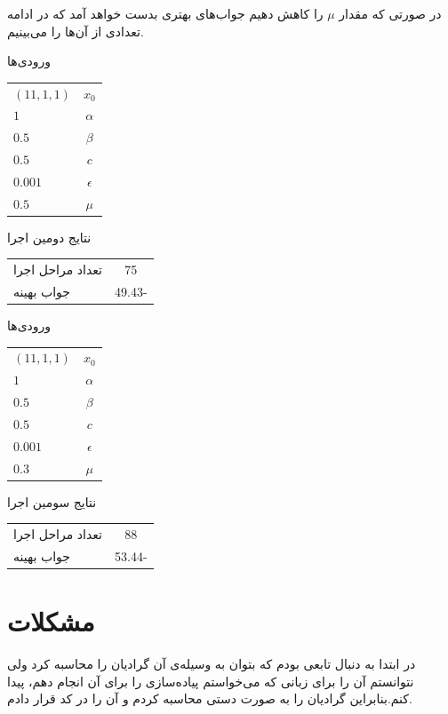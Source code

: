 \documentclass[paper=a4, fontsize=11pt]{article}
\numberwithin{equation}{section} %
\numberwithin{figure}{section} %
\numberwithin{table}{section} %
\begin{document}
\par
	در صورتی که مقدار $\mu$ را کاهش دهیم جواب‌های بهتری بدست خواهد آمد که در ادامه تعدادی از آن‌ها را می‌بینیم.

\begin{center}
	ورودی‌ها\\
	\begin{tabular}{| l | c |}
		\hline
		$(11, 1, 1)$ & $x_0$ \\
		$1$ & $\alpha$ \\
		$0.5$ & $\beta$ \\
		$0.5$ & $c$ \\
		$0.001$ & $\epsilon$ \\
		$0.5$ & $\mu$ \\
		\hline
	\end{tabular}
\end{center}

\begin{center}
	نتایج دومین اجرا\\
	\begin{tabular}{| l | c |}
		\hline
		تعداد مراحل اجرا & 75 \\
		جواب بهینه & 49.43- \\
		\hline
	\end{tabular}
\end{center}

\begin{center}
	ورودی‌ها\\
	\begin{tabular}{| l | c |}
		\hline
		$(11, 1, 1)$ & $x_0$ \\
		$1$ & $\alpha$ \\
		$0.5$ & $\beta$ \\
		$0.5$ & $c$ \\
		$0.001$ & $\epsilon$ \\
		$0.3$ & $\mu$ \\
		\hline
	\end{tabular}
\end{center}

\begin{center}
	نتایج سومین اجرا\\
	\begin{tabular}{| l | c |}
		\hline
		تعداد مراحل اجرا & 88 \\
		جواب بهینه & 53.44- \\
		\hline
	\end{tabular}
\end{center}

\section{مشکلات}
\indent \par
	در ابتدا به دنبال تابعی بودم که بتوان به وسیله‌ی آن گرادیان را محاسبه کرد ولی نتوانستم آن را برای زبانی
	که می‌خواستم پیاده‌سازی را برای آن انجام دهم، پیدا کنم.بنابراین گرادیان را به صورت دستی محاسبه کردم و آن را در کد قرار دادم.
\end{document}
